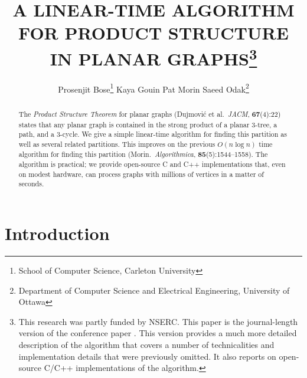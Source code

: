 \documentclass{patmorin}
\title{\MakeUppercase{A Linear-Time Algorithm for Product Structure in Planar Graphs}\thanks{This research was partly funded by NSERC. This paper is the journal-length version of the conference paper \cite{bose.morin.ea:linear}. This version provides a much more detailed description of the algorithm that covers a number of technicalities and implementation details that were previously omitted. It also reports on open-source C/C++ implementations of the algorithm.}}
\author{%
  Prosenjit Bose\thanks{School of Computer Science, Carleton University}\qquad
  Kaya Gouin\footnotemark[1]\qquad
  Pat Morin\footnotemark[1]\qquad
  Saeed Odak\thanks{Department of Computer Science and Electrical Engineering, University of Ottawa}}
\date{}
\begin{document}
\maketitle

\begin{abstract}
  The \emph{Product Structure Theorem} for planar graphs (Dujmović et al.\ \emph{JACM}, \textbf{67}(4):22) states that any planar graph is contained in the strong product of a planar $3$-tree, a path, and a $3$-cycle.  We give a simple linear-time algorithm for finding this partition as well as several related partitions.  This improves on the previous $O(n\log n)$ time algorithm for finding this partition (Morin.\ \emph{Algorithmica}, \textbf{85}(5):1544--1558). The algorithm is practical; we provide open-source C and C++ implementations that, even on modest hardware, can process graphs with millions of vertices in a matter of seconds. 
\end{abstract}

%

\section{Introduction}
\end{document}
